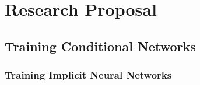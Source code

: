 \documentclass[thesis]{subfiles}
\begin{document}
\chapter{Research Proposal}
\label{futurework}

\section{Training Conditional Networks}
\subsection{Training Implicit Neural Networks}
\end{document}

